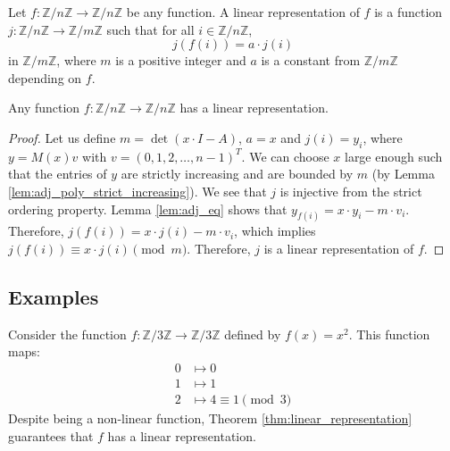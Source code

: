 \begin{definition}
\label{def:linear_representation}
\leanok
Let $f: \mathbb{Z}/n\mathbb{Z} \to \mathbb{Z}/n\mathbb{Z}$ be any function. A linear representation of $f$ is a function $j: \mathbb{Z}/n\mathbb{Z} \to \mathbb{Z}/m\mathbb{Z}$ such that for all $i\in \mathbb{Z}/n\mathbb{Z}$,
$$j(f(i)) = a \cdot j(i)$$
in $\mathbb{Z}/m\mathbb{Z}$, where $m$ is a positive integer and $a$ is a constant from $\mathbb{Z}/m\mathbb{Z}$ depending on $f$.
\end{definition}

\begin{theorem}
\label{thm:linear_representation}
Any function $f: \mathbb{Z}/n\mathbb{Z} \to \mathbb{Z}/n\mathbb{Z}$ has a linear representation.
\end{theorem}

\begin{proof}
Let us define $m = \det(x\cdot I - A)$, $a = x$ and $j(i) = y_i$, where $y = M(x)v$ with $v = (0,1,2,\ldots,n-1)^T$. 
We can choose $x$ large enough such that the entries of $y$ are strictly increasing and are bounded by $m$ 
(by Lemma \ref{lem:adj_poly_strict_increasing}). 
We see that $j$ is injective from the strict ordering property.
Lemma \ref{lem:adj_eq} shows that $y_{f(i)} = x\cdot y_i - m\cdot v_i$.
Therefore, $j(f(i)) = x\cdot j(i) - m\cdot v_i$, which implies $j(f(i)) \equiv x\cdot j(i) \pmod{m}$.
Therefore, $j$ is a linear representation of $f$.
\end{proof}

\subsection*{Examples}

\begin{example}
\label{ex:quadratic_Z3}
Consider the function $f: \mathbb{Z}/3\mathbb{Z} \to \mathbb{Z}/3\mathbb{Z}$ defined by $f(x) = x^2$.
This function maps:
\begin{align*}
0 &\mapsto 0 \\
1 &\mapsto 1 \\
2 &\mapsto 4 \equiv 1 \pmod{3}
\end{align*}
Despite being a non-linear function, Theorem \ref{thm:linear_representation} guarantees that $f$ has a linear representation.
\end{example}

